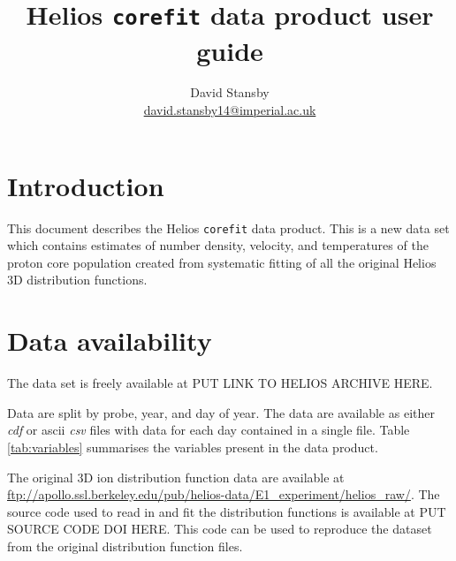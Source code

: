 \documentclass[11pt,a4paper]{article}
\begin{document}
\title{Helios \texttt{corefit} data product user guide}
\author{David Stansby \\
\href{mailto:david.stansby14@imperial.ac.uk}{david.stansby14@imperial.ac.uk}}
\maketitle

\section{Introduction}
This document describes the Helios \texttt{corefit} data product. This is a new data set which contains estimates of number density, velocity, and temperatures of the proton core population created from systematic fitting of all the original Helios 3D distribution functions.

\section{Data availability}
The data set is freely available at PUT LINK TO HELIOS ARCHIVE HERE.

Data are split by probe, year, and day of year. The data are available as either \emph{cdf} or ascii \emph{csv} files with data for each day contained in a single file. Table \ref{tab:variables} summarises the variables present in the data product.

The original 3D ion distribution function data are available at \url{ftp://apollo.ssl.berkeley.edu/pub/helios-data/E1_experiment/helios_raw/}. The source code used to read in and fit the distribution functions is available at PUT SOURCE CODE DOI HERE. This code can be used to reproduce the dataset from the original distribution function files.
\end{document}
